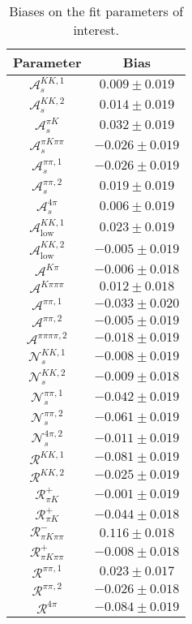 \begin{table}
  \centering
  \begin{tabular}{cc}
  \toprule
      Parameter & Bias \\
  \midrule
      $\mathcal{A}_s^{KK,1}$ & $0.009 \pm 0.019$ \\
      $\mathcal{A}_s^{KK,2}$ & $0.014 \pm 0.019$ \\
      $\mathcal{A}_s^{\pi K}$ & $0.032 \pm 0.019$ \\
      $\mathcal{A}_s^{\pi K\pi\pi}$ & $-0.026 \pm 0.019$ \\
      $\mathcal{A}_s^{\pi\pi,1}$ & $-0.026 \pm 0.019$ \\
      $\mathcal{A}_s^{\pi\pi,2}$ & $0.019 \pm 0.019$ \\
      $\mathcal{A}_s^{4\pi}$ & $0.006 \pm 0.019$ \\
      $\mathcal{A}_\mathrm{low}^{KK,1}$ & $0.023 \pm 0.019$ \\
      $\mathcal{A}_\mathrm{low}^{KK,2}$ & $-0.005 \pm 0.019$ \\
      $\mathcal{A}^{K\pi}$ & $-0.006 \pm 0.018$ \\
      $\mathcal{A}^{K\pi\pi\pi}$ & $0.012 \pm 0.018$ \\
      $\mathcal{A}^{\pi\pi,1}$ & $-0.033 \pm 0.020$ \\
      $\mathcal{A}^{\pi\pi,2}$ & $-0.005 \pm 0.019$ \\
      $\mathcal{A}^{\pi\pi\pi\pi,2}$ & $-0.018 \pm 0.019$ \\
      $\mathcal{N}_s^{KK,1}$ & $-0.008 \pm 0.019$ \\
      $\mathcal{N}_s^{KK,2}$ & $-0.009 \pm 0.018$ \\
      $\mathcal{N}_s^{\pi\pi,1}$ & $-0.042 \pm 0.019$ \\
      $\mathcal{N}_s^{\pi\pi,2}$ & $-0.061 \pm 0.019$ \\
      $\mathcal{N}_s^{4\pi,2}$ & $-0.011 \pm 0.019$ \\
      $\mathcal{R}^{KK,1}$ & $-0.081 \pm 0.019$ \\
      $\mathcal{R}^{KK,2}$ & $-0.025 \pm 0.019$ \\
      $\mathcal{R}_{\pi K}^+$ & $-0.001 \pm 0.019$ \\
      $\mathcal{R}_{\pi K}^+$ & $-0.044 \pm 0.018$ \\
      $\mathcal{R}_{\pi K\pi\pi}^-$ & $0.116 \pm 0.018$ \\
      $\mathcal{R}_{\pi K\pi\pi}^+$ & $-0.008 \pm 0.018$ \\
      $\mathcal{R}^{\pi\pi,1}$ & $0.023 \pm 0.017$ \\
      $\mathcal{R}^{\pi\pi,2}$ & $-0.026 \pm 0.018$ \\
      $\mathcal{R}^{4\pi}$ & $-0.084 \pm 0.019$ \\
      \bottomrule
  \end{tabular}
  \caption{Biases on the fit parameters of interest.}
\label{tab:biases}
\end{table}
